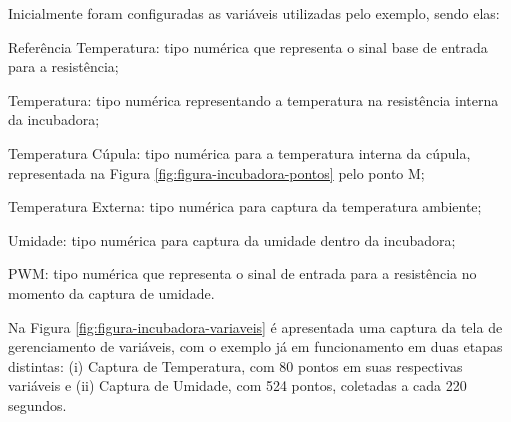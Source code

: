         \begin{figure}[!h]
    	\end{figure}
\newpage
Inicialmente foram configuradas as variáveis utilizadas pelo exemplo, sendo elas:
\begin{alineascomponto}
    \item Referência Temperatura: tipo numérica que representa o sinal base de entrada para a resistência;
    \item Temperatura: tipo numérica representando a temperatura na resistência interna da incubadora;
    \item Temperatura Cúpula: tipo numérica para a temperatura interna da cúpula, representada na Figura \ref{fig:figura-incubadora-pontos} pelo ponto M;
    \item Temperatura Externa: tipo numérica para captura da temperatura ambiente;
    \item Umidade: tipo numérica para captura da umidade dentro da incubadora;
    \item PWM: tipo numérica que representa o sinal de entrada para a resistência no momento da captura de umidade.
\end{alineascomponto}

Na Figura \ref{fig:figura-incubadora-variaveis} é apresentada uma captura da tela de gerenciamento de variáveis, com o exemplo já em funcionamento em duas etapas distintas: (i) Captura de Temperatura, com 80 pontos em suas respectivas variáveis e (ii) Captura de Umidade, com 524 pontos, coletadas a cada 220 segundos.
    	
